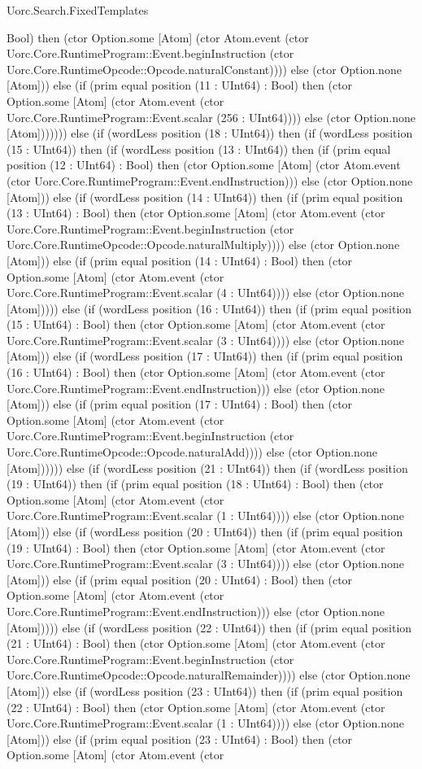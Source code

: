 \begin{lexlean}{Uorc.Search.FixedTemplates}
\begin{semanticmodule}
{Bool) then (ctor Option.some [Atom] (ctor Atom.event (ctor Uorc.Core.RuntimeProgram::Event.beginInstruction (ctor Uorc.Core.RuntimeOpcode::Opcode.naturalConstant)))) else (ctor Option.none [Atom])) else (if (prim equal position (11 : UInt64) : Bool) then (ctor Option.some [Atom] (ctor Atom.event (ctor Uorc.Core.RuntimeProgram::Event.scalar (256 : UInt64)))) else (ctor Option.none [Atom])))))) else (if (wordLess position (18 : UInt64)) then (if (wordLess position (15 : UInt64)) then (if (wordLess position (13 : UInt64)) then (if (prim equal position (12 : UInt64) : Bool) then (ctor Option.some [Atom] (ctor Atom.event (ctor Uorc.Core.RuntimeProgram::Event.endInstruction))) else (ctor Option.none [Atom])) else (if (wordLess position (14 : UInt64)) then (if (prim equal position (13 : UInt64) : Bool) then (ctor Option.some [Atom] (ctor Atom.event (ctor Uorc.Core.RuntimeProgram::Event.beginInstruction (ctor Uorc.Core.RuntimeOpcode::Opcode.naturalMultiply)))) else (ctor Option.none [Atom])) else (if (prim equal position (14 : UInt64) : Bool) then (ctor Option.some [Atom] (ctor Atom.event (ctor Uorc.Core.RuntimeProgram::Event.scalar (4 : UInt64)))) else (ctor Option.none [Atom])))) else (if (wordLess position (16 : UInt64)) then (if (prim equal position (15 : UInt64) : Bool) then (ctor Option.some [Atom] (ctor Atom.event (ctor Uorc.Core.RuntimeProgram::Event.scalar (3 : UInt64)))) else (ctor Option.none [Atom])) else (if (wordLess position (17 : UInt64)) then (if (prim equal position (16 : UInt64) : Bool) then (ctor Option.some [Atom] (ctor Atom.event (ctor Uorc.Core.RuntimeProgram::Event.endInstruction))) else (ctor Option.none [Atom])) else (if (prim equal position (17 : UInt64) : Bool) then (ctor Option.some [Atom] (ctor Atom.event (ctor Uorc.Core.RuntimeProgram::Event.beginInstruction (ctor Uorc.Core.RuntimeOpcode::Opcode.naturalAdd)))) else (ctor Option.none [Atom]))))) else (if (wordLess position (21 : UInt64)) then (if (wordLess position (19 : UInt64)) then (if (prim equal position (18 : UInt64) : Bool) then (ctor Option.some [Atom] (ctor Atom.event (ctor Uorc.Core.RuntimeProgram::Event.scalar (1 : UInt64)))) else (ctor Option.none [Atom])) else (if (wordLess position (20 : UInt64)) then (if (prim equal position (19 : UInt64) : Bool) then (ctor Option.some [Atom] (ctor Atom.event (ctor Uorc.Core.RuntimeProgram::Event.scalar (3 : UInt64)))) else (ctor Option.none [Atom])) else (if (prim equal position (20 : UInt64) : Bool) then (ctor Option.some [Atom] (ctor Atom.event (ctor Uorc.Core.RuntimeProgram::Event.endInstruction))) else (ctor Option.none [Atom])))) else (if (wordLess position (22 : UInt64)) then (if (prim equal position (21 : UInt64) : Bool) then (ctor Option.some [Atom] (ctor Atom.event (ctor Uorc.Core.RuntimeProgram::Event.beginInstruction (ctor Uorc.Core.RuntimeOpcode::Opcode.naturalRemainder)))) else (ctor Option.none [Atom])) else (if (wordLess position (23 : UInt64)) then (if (prim equal position (22 : UInt64) : Bool) then (ctor Option.some [Atom] (ctor Atom.event (ctor Uorc.Core.RuntimeProgram::Event.scalar (1 : UInt64)))) else (ctor Option.none [Atom])) else (if (prim equal position (23 : UInt64) : Bool) then (ctor Option.some [Atom] (ctor Atom.event (ctor }
\end{semanticmodule}
\end{lexlean}
